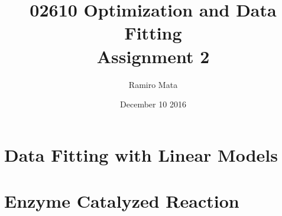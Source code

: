 
\author{Ramiro Mata}
\title{02610 Optimization and Data Fitting \\ \Large{Assignment 2}}
\date{December 10 2016}

\maketitle
\thispagestyle{fancy}
\section{Data Fitting with Linear Models}


\clearpage
\section{Enzyme Catalyzed Reaction}


\clearpage
{}
\appendix


